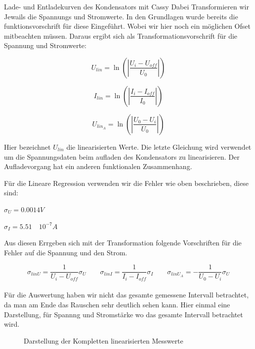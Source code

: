 \documentclass[twoside]{protokoll}
\begin{document}
\begin{aufgabe}{Lade- und Entladekurven des Kondensators mit Cassy}
Dabei Transformieren wir Jewails die Spannungs und Stromwerte. In den Grundlagen wurde bereits die funktionsvorschrift für diese Eingeführt. Wobei wir hier noch ein möglichen Ofset mitbeachten müssen. Daraus ergibt sich als Transformationsvorschrift für die Spannung und Stromwerte:

\begin{equation}
 U_{lin} = \ln\left(\left|\frac{U_i - U_{off}}{U_0}\right|\right)
\end{equation}


\begin{equation}
 I_{lin} = \ln\left(\left|\frac{I_i - I_{off}}{I_0}\right|\right)
\end{equation}

\begin{equation}
 U_{lin_A} = \ln\left(\left|\frac{U_0 - U_i}{U_0}\right|\right)
\end{equation}

Hier bezeichnet $U_{lin}$ die linearisierten Werte. Die letzte Gleichung wird verwendet um die Spannungsdaten beim aufladen des Kondensators zu linearisieren. 
Der Aufladevorgang hat ein anderen funktionalen Zusammenhang.

Für die Lineare Regression verwenden wir die Fehler wie oben beschrieben, diese sind:

$\sigma_U = 0.0014 V $

$\sigma_I = 5.51 \quad 10^{-7} A $

Aus diesen Errgeben sich mit der Transformation folgende Vorschriften für die Fehler auf die Spannung und den Strom.

\begin{equation}
	\sigma_{lin U} = \frac{1}{U_i - U_{off}} \sigma_U \qquad
	\sigma_{lin I} = \frac{1}{I_i - I_{off}} \sigma_I \qquad
	\sigma_{lin U_A} = -\frac{1}{U_0 - U_i} \sigma_U
\end{equation}\\
 
Für die Auswertung haben wir nicht das gesamte gemessene Intervall betrachtet, da man am Ende das Rauschen sehr deutlich sehen kann.
Hier einmal eine Darstellung, für Spannng und Stromstärke wo das gesamte Intervall betrachtet wird.

\begin{figure}[H]
    \centering
    \hfill
    \caption{Darstellung der Kompletten linearisierten Messwerte}
    \centering
\end{figure}


\end{aufgabe}
\end{document}
